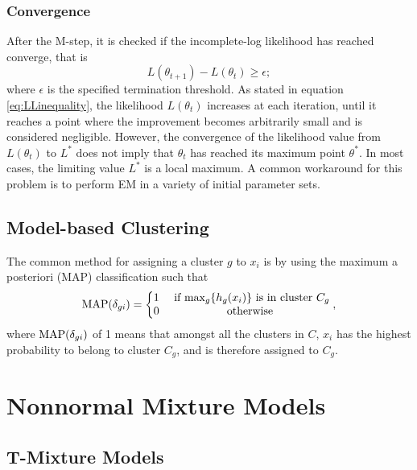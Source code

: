 \subsubsection{Convergence}
\label{sec:convergence}
After the M-step, it is checked if the incomplete-log likelihood has reached converge, that is
\begin{equation*}
    L(\theta_{t+1}) -L(\theta_{t}) \geqslant \epsilon ;
\end{equation*}
where $\epsilon$ is the specified termination threshold. As stated in equation \ref{eq:LLinequality}, the likelihood $\displaystyle L(\theta _{t})$ increases at each iteration, until it reaches a point where the improvement becomes arbitrarily small and is considered negligible. However, the convergence of the likelihood value from $L(\theta_{t})$ to $L^*$ does not imply that $\theta_{t}$ has reached its maximum point $\theta^*$. In most cases, the limiting value $L^*$ is a local maximum. A common workaround for this problem is to perform EM in a variety of initial parameter sets.

\subsection{Model-based Clustering}
\label{sec:modelbasedclustering}


The common method for assigning a cluster \(g\) to \(x_i\) is by using the maximum a posteriori (MAP) classification such that 
\begin{equation}
    \textup{MAP}(\delta_{gi}) = \left\{
        \begin{matrix}
            1 & \textup{ if } \textup{max}_g\{h_g(x_i)\} \textup{ is in cluster } C_g \\ 
            0 & \textup{ otherwise }
        \end{matrix}\right. ,
\end{equation}
\noindent
where \(\textup{MAP}(\delta_{gi})\) of 1 means that amongst all the clusters in \(C\), \(x_i\) has the highest probability to belong to cluster \(C_g\), and is therefore assigned to \(C_g\).

\section{Nonnormal Mixture Models}
\label{sec:nonnormalMixModels}

\subsection{T-Mixture Models}
\label{sec:tmix_ch3}

